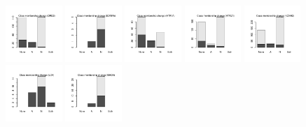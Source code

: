 \documentclass[10pt,article]{memoir}
\begin{document}
\begin{figure}[h!]
\includegraphics[width=0.19\textwidth]{figures/validation_plots/drd2_0p8_valplot.pdf}
\includegraphics[width=0.19\textwidth]{figures/validation_plots/ednra_0p8_valplot.pdf}
\includegraphics[width=0.19\textwidth]{figures/validation_plots/htr1a_0p8_valplot.pdf}
\includegraphics[width=0.19\textwidth]{figures/validation_plots/htr2a_0p8_valplot.pdf}
\includegraphics[width=0.19\textwidth]{figures/validation_plots/kcnh2_0p8_valplot.pdf}
\includegraphics[width=0.19\textwidth]{figures/validation_plots/lck_0p8_valplot.pdf}
\includegraphics[width=0.19\textwidth]{figures/validation_plots/maoa_0p8_valplot.pdf}

\end{figure}
\end{document}
